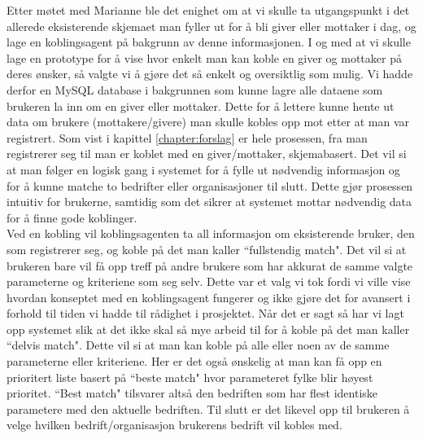 Etter møtet med Marianne ble det enighet om at vi skulle ta utgangspunkt i det allerede eksisterende skjemaet man fyller ut for å bli giver eller mottaker i dag, og lage en koblingsagent på bakgrunn av denne informasjonen. I og med at vi skulle lage en prototype for å vise hvor enkelt man kan koble en giver og mottaker på deres ønsker, så valgte vi å gjøre det så enkelt og oversiktlig som mulig. Vi hadde derfor en MySQL database i bakgrunnen som kunne lagre alle dataene som brukeren la inn om en giver eller mottaker. Dette for å lettere kunne hente ut data om brukere (mottakere/givere) man skulle kobles opp mot etter at man var registrert. Som vist i kapittel \ref{chapter:forslag} er hele prosessen, fra man registrerer seg til man er koblet med en giver/mottaker, skjemabasert. Det vil si at man følger en logisk gang i systemet for å fylle ut nødvendig informasjon og for å kunne matche to bedrifter eller organisasjoner til slutt. Dette gjør prosessen intuitiv for brukerne, samtidig som det sikrer at systemet mottar nødvendig data for å finne gode koblinger.\\

Ved en kobling vil koblingsagenten ta all informasjon om eksisterende bruker, den som registrerer seg, og koble på det man kaller ``fullstendig match". Det vil si at brukeren bare vil få opp treff på andre brukere som har akkurat de samme valgte parameterne og kriteriene som seg selv. Dette var et valg vi tok fordi vi ville vise hvordan konseptet med en koblingsagent fungerer og ikke gjøre det for avansert i forhold til tiden vi hadde til rådighet i prosjektet. Når det er sagt så har vi lagt opp systemet slik at det ikke skal så mye arbeid til for å koble på det man kaller ``delvis match". Dette vil si at man kan koble på alle eller noen av de samme parameterne eller kriteriene. Her er det også ønskelig at man kan få opp en prioritert liste basert på ``beste match" hvor parameteret fylke blir høyest prioritet. ``Best match" tilsvarer altså den bedriften som har flest identiske parametere med den aktuelle bedriften. Til slutt er det likevel opp til brukeren å velge hvilken bedrift/organisasjon brukerens bedrift vil kobles med.
